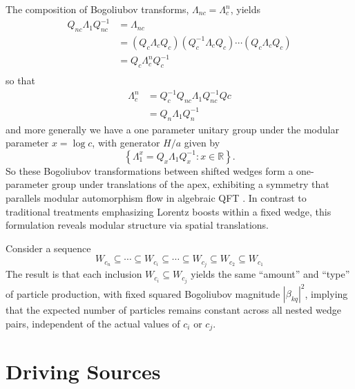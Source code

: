 \documentclass[12pt,a4paper]{article}
\begin{document}
The composition of Bogoliubov transforms, $\Lambda_{nc} = \Lambda_c^n$, yields
\begin{equation}
  \begin{array}{ll}    
    Q_{nc} \Lambda_1 Q_{nc}^{-1}  &= \Lambda_{nc} \\
         &= \left(Q_c \Lambda_{c} Q_c\right) \left( Q_c^{-1} \Lambda_{c} Q_c\right) \cdots \left(Q_c \Lambda_{c} Q_c\right) \\
  &= Q_c \Lambda_c^n Q_c^{-1} \\
  \end{array}
\end{equation}
so that
\begin{equation}
  \begin{array}{ll}
  \Lambda_c^n &= Q_c^{-1} Q_{nc} \Lambda_1 Q_{nc}^{-1} Q{c} \\
  &= Q_n \Lambda_1 Q_n^{-1}
  \end{array}
\end{equation}
and more generally we have a one parameter unitary group under the modular parameter $x = \log c$, with generator $H/a$ given by
\begin{equation}
  \left\{\Lambda_1^x = Q_x \Lambda_1 Q_x^{-1} : x \in \mathbb{R} \right\}.
\end{equation}
So these Bogoliubov transformations between shifted wedges form a one-parameter group under translations of the apex, exhibiting a symmetry that parallels modular automorphism flow in algebraic QFT \cite{borchers2000revolutionizing}. In contrast to traditional treatments emphasizing Lorentz boosts within a fixed wedge, this formulation reveals modular structure via spatial translations.

Consider a sequence
\begin{equation}
  W_{c_n} \subseteq \cdots \subseteq W_{c_i} \subseteq \cdots \subseteq W_{c_j} \subseteq W_{c_2} \subseteq W_{c_1}
  \label{chain}
\end{equation}
The result is that each inclusion $W_{c_i} \subseteq W_{c_j}$ yields the same ``amount'' and ``type'' of particle production, with fixed squared Bogoliubov magnitude $|\beta_{kq}|^2$, implying that the expected number of particles remains constant across all nested wedge pairs, independent of the actual values of $c_i$ or $c_j$.  

\section{Driving Sources}
\end{document}
